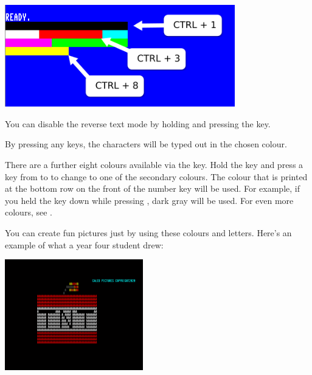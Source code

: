 \begin{center}
\includegraphics[width={10cm}]{images/introduction-screen/colour-bars.png}
\end{center}


You can disable the reverse text mode by holding  and pressing the  key.

By pressing any keys, the characters will be typed out in the chosen colour.

There are a further eight colours available via the \megasymbolkey key. Hold the \megasymbolkey key and press a key from  to  to change to one of the secondary colours. The colour that is printed at the bottom row on the front of the number key will be used. For example, if you held the \megasymbolkey key down while pressing , dark gray will be used. For even more colours, see .

\needspace{4cm}
You can create fun pictures just by using these colours and letters.  Here's an example of what a year four student drew:

\begin{center}
\includegraphics[width={6cm}]{images/caleb-PETSCII-TNT-final}
\end{center}

